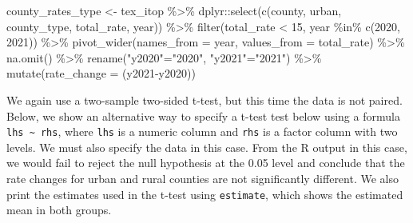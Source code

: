 \documentclass[
  letterpaper,
]{krantz}
\makeatletter
\newenvironment{Shaded}{\begin{snugshade}}{\end{snugshade}}
\newcommand{\AttributeTok}[1]{\textcolor[rgb]{0.40,0.45,0.13}{#1}}
\newcommand{\DecValTok}[1]{\textcolor[rgb]{0.68,0.00,0.00}{#1}}
\newcommand{\FunctionTok}[1]{\textcolor[rgb]{0.28,0.35,0.67}{#1}}
\newcommand{\NormalTok}[1]{\textcolor[rgb]{0.00,0.23,0.31}{#1}}
\newcommand{\OtherTok}[1]{\textcolor[rgb]{0.00,0.23,0.31}{#1}}
\newcommand{\SpecialCharTok}[1]{\textcolor[rgb]{0.37,0.37,0.37}{#1}}
\newcommand{\StringTok}[1]{\textcolor[rgb]{0.13,0.47,0.30}{#1}}
\newenvironment{kframe}{%
\medskip{}
\setlength{\fboxsep}{.8em}
 \def\at@end@of@kframe{}%
 \ifinner\ifhmode%
  \def\at@end@of@kframe{\end{minipage}}%
  \begin{minipage}{\columnwidth}%
 \fi\fi%
 \def\FrameCommand##1{\hskip\@totalleftmargin \hskip-\fboxsep
 \colorbox{shadecolor}{##1}\hskip-\fboxsep
     \hskip-\linewidth \hskip-\@totalleftmargin \hskip\columnwidth}%
 \MakeFramed {\advance\hsize-\width
   \@totalleftmargin\z@ \linewidth\hsize
   \@setminipage}}%
 {\par\unskip\endMakeFramed%
 \at@end@of@kframe}
\renewenvironment{Shaded}{\begin{kframe}}{\end{kframe}}
\makeatother
\begin{document}
\begin{Shaded}
\begin{Highlighting}[]
\NormalTok{county\_rates\_type }\OtherTok{\textless{}{-}}\NormalTok{ tex\_itop }\SpecialCharTok{\%\textgreater{}\%}
\NormalTok{  dplyr}\SpecialCharTok{::}\FunctionTok{select}\NormalTok{(}\FunctionTok{c}\NormalTok{(county, urban, county\_type, total\_rate, year)) }\SpecialCharTok{\%\textgreater{}\%}
  \FunctionTok{filter}\NormalTok{(total\_rate }\SpecialCharTok{\textless{}} \DecValTok{15}\NormalTok{, year }\SpecialCharTok{\%in\%} \FunctionTok{c}\NormalTok{(}\DecValTok{2020}\NormalTok{, }\DecValTok{2021}\NormalTok{)) }\SpecialCharTok{\%\textgreater{}\%}
  \FunctionTok{pivot\_wider}\NormalTok{(}\AttributeTok{names\_from =}\NormalTok{ year, }\AttributeTok{values\_from =}\NormalTok{ total\_rate) }\SpecialCharTok{\%\textgreater{}\%}
  \FunctionTok{na.omit}\NormalTok{() }\SpecialCharTok{\%\textgreater{}\%}
  \FunctionTok{rename}\NormalTok{(}\StringTok{"y2020"}\OtherTok{=}\StringTok{"2020"}\NormalTok{, }\StringTok{"y2021"}\OtherTok{=}\StringTok{"2021"}\NormalTok{) }\SpecialCharTok{\%\textgreater{}\%}
  \FunctionTok{mutate}\NormalTok{(}\AttributeTok{rate\_change =}\NormalTok{ (y2021}\SpecialCharTok{{-}}\NormalTok{y2020)) }
\end{Highlighting}
\end{Shaded}

We again use a two-sample two-sided t-test, but this time the data is
not paired. Below, we show an alternative way to specify a t-test test
below using a formula \texttt{lhs\ \textasciitilde{}\ rhs}, where
\texttt{lhs} is a numeric column and \texttt{rhs} is a factor column
with two levels. We must also specify the data in this case. From the R
output in this case, we would fail to reject the null hypothesis at the
0.05 level and conclude that the rate changes for urban and rural
counties are not significantly different. We also print the estimates
used in the t-test using \texttt{estimate}, which shows the estimated
mean in both groups.
\end{document}
